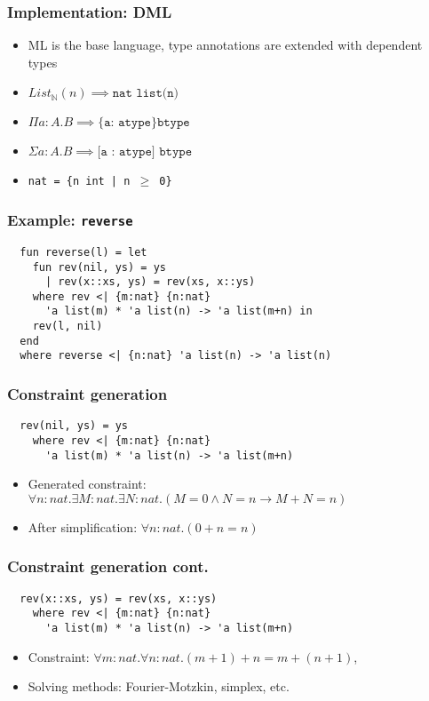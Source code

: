 \documentclass[pdf]{beamer}
\begin{document}
\begin{frame}
  \frametitle{Implementation: DML}

  \begin{itemize}
    \item ML is the base language, type annotations are extended with dependent
      types
    \item $\mathit{List_\mathbb{N}(n)} \implies \texttt{nat list(n)}$
    \item $\Pi a: A.B \implies \texttt{\{a: atype\} btype}$
    \item $\Sigma a: A.B \implies \texttt{[a : atype] btype}$
    \item \texttt{nat = \{n int | n $\geq$ 0\}}
  \end{itemize}
\end{frame}

\begin{frame}[fragile]
  \frametitle{Example: \texttt{reverse}}

  \begin{verbatim}
  fun reverse(l) = let
    fun rev(nil, ys) = ys
      | rev(x::xs, ys) = rev(xs, x::ys)
    where rev <| {m:nat} {n:nat}
      'a list(m) * 'a list(n) -> 'a list(m+n) in
    rev(l, nil)
  end
  where reverse <| {n:nat} 'a list(n) -> 'a list(n)
  \end{verbatim}
\end{frame}

\begin{frame}[fragile]
  \frametitle{Constraint generation}
  \begin{verbatim}
  rev(nil, ys) = ys
    where rev <| {m:nat} {n:nat}
      'a list(m) * 'a list(n) -> 'a list(m+n)
  \end{verbatim}

  \begin{itemize}
    \item Generated constraint: $\forall n : nat. \exists M : nat. \exists N :
      nat. (M = 0 \land N = n \to M + N = n)$

    \item After simplification: $\forall n : nat. (0 + n = n)$
  \end{itemize}
\end{frame}

\begin{frame}[fragile]
  \frametitle{Constraint generation cont.}

  \begin{verbatim}
  rev(x::xs, ys) = rev(xs, x::ys)
    where rev <| {m:nat} {n:nat}
      'a list(m) * 'a list(n) -> 'a list(m+n)
  \end{verbatim}

  \begin{itemize}
    \item Constraint:
      $\forall m : nat. \forall n : nat.(m + 1) + n = m + (n + 1)$,

    \item Solving methods: Fourier-Motzkin, simplex, etc.
  \end{itemize}
\end{frame}
\end{document}
